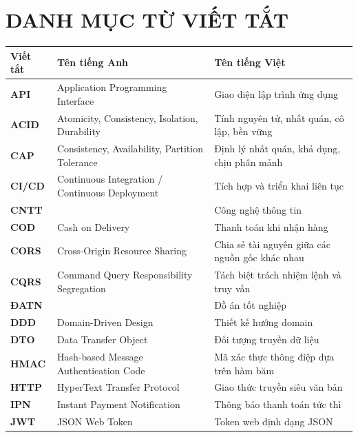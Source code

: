 \documentclass[../DoAn.tex]{subfiles}
\begin{document}
\chapter*{DANH MỤC TỪ VIẾT TẮT}
{}

\begin{longtable}{p{2.2cm} p{5.2cm} p{5.6cm}}
    \hline
    \textbf{Viết tắt} & \textbf{Tên tiếng Anh} & \textbf{Tên tiếng Việt} \\ \hline

    \textbf{API}    & Application Programming Interface         & Giao diện lập trình ứng dụng \\
    \textbf{ACID}   & Atomicity, Consistency, Isolation, Durability & Tính nguyên tử, nhất quán, cô lập, bền vững \\
    \textbf{CAP}    & Consistency, Availability, Partition Tolerance & Định lý nhất quán, khả dụng, chịu phân mảnh \\
    \textbf{CI/CD}  & Continuous Integration / Continuous Deployment & Tích hợp và triển khai liên tục \\
    \textbf{CNTT}   &                                            & Công nghệ thông tin \\
    \textbf{COD}    & Cash on Delivery                          & Thanh toán khi nhận hàng \\
    \textbf{CORS}   & Cross-Origin Resource Sharing             & Chia sẻ tài nguyên giữa các nguồn gốc khác nhau \\
    \textbf{CQRS}   & Command Query Responsibility Segregation  & Tách biệt trách nhiệm lệnh và truy vấn \\
    \textbf{ĐATN}   &                                            & Đồ án tốt nghiệp \\
    \textbf{DDD}    & Domain-Driven Design                      & Thiết kế hướng domain \\
    \textbf{DTO}    & Data Transfer Object                      & Đối tượng truyền dữ liệu \\
    \textbf{HMAC}   & Hash-based Message Authentication Code    & Mã xác thực thông điệp dựa trên hàm băm \\
    \textbf{HTTP}   & HyperText Transfer Protocol               & Giao thức truyền siêu văn bản \\
    \textbf{IPN}    & Instant Payment Notification              & Thông báo thanh toán tức thì \\
    \textbf{JWT}    & JSON Web Token                            & Token web định dạng JSON \\

\end{longtable}
\end{document}
